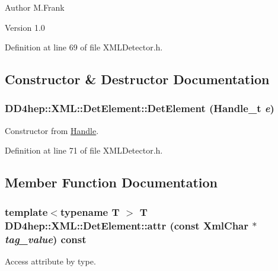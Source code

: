 \begin{DoxyAuthor}{Author}
M.Frank 
\end{DoxyAuthor}
\begin{DoxyVersion}{Version}
1.0 
\end{DoxyVersion}


Definition at line 69 of file XMLDetector.h.

\subsection{Constructor \& Destructor Documentation}
\hypertarget{struct_d_d4hep_1_1_x_m_l_1_1_det_element_af9a3855887f30e3cb111f8c19956c7c6}{
\subsubsection[{DetElement}]{\setlength{\rightskip}{0pt plus 5cm}DD4hep::XML::DetElement::DetElement ({\bf Handle\_\-t} {\em e})}}
\label{struct_d_d4hep_1_1_x_m_l_1_1_det_element_af9a3855887f30e3cb111f8c19956c7c6}


Constructor from \hyperlink{class_d_d4hep_1_1_handle}{Handle}. 

Definition at line 71 of file XMLDetector.h.

\subsection{Member Function Documentation}
\hypertarget{struct_d_d4hep_1_1_x_m_l_1_1_det_element_a67cb642288a9c27ca09a1755ee92e994}{
\subsubsection[{attr}]{\setlength{\rightskip}{0pt plus 5cm}template$<$typename T $>$ {\bf T} DD4hep::XML::DetElement::attr (const {\bf XmlChar} $\ast$ {\em tag\_\-value}) const}}
\label{struct_d_d4hep_1_1_x_m_l_1_1_det_element_a67cb642288a9c27ca09a1755ee92e994}


Access attribute by type. 

